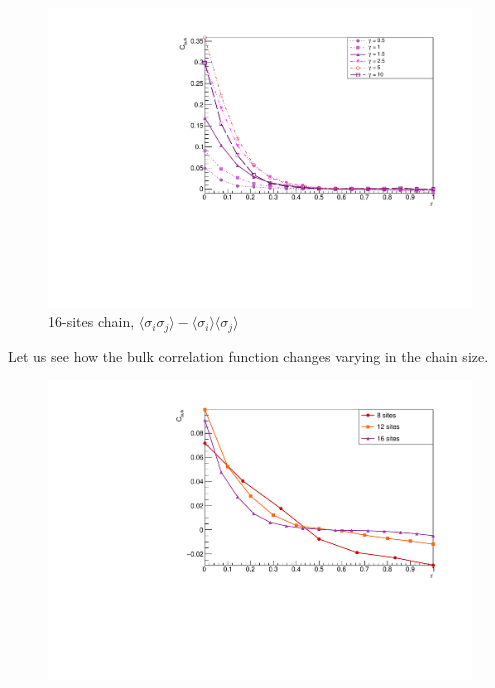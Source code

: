 \begin{figure}[H]
    \centering
    \includegraphics[scale=0.7]{Figures/16sites/16sites_CFBulkCONNVSgamma.pdf}
    \caption{16-sites chain, $\langle\sigma_i\sigma_j \rangle - \langle\sigma_i \rangle\langle\sigma_j \rangle$}
    \label{fig:my_label}
\end{figure}

Let us see how the bulk correlation function changes varying in the chain size.

\begin{figure}[H]
    \centering
    \includegraphics[scale=0.7]{Figures/CBulkwConnTermVSsize_J1051.pdf}
    \caption{}
    \label{fig:my_label}
\end{figure}

